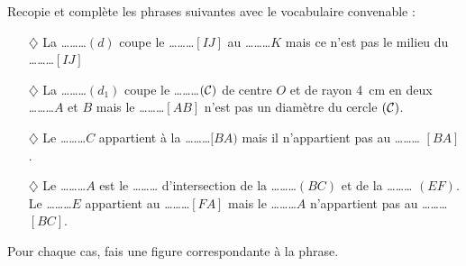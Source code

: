 \begin{myenumerate}
\item Recopie et complète les phrases suivantes avec le vocabulaire
convenable :
\begin{itemize}
\item[$\diamondsuit$] La \dots\dots\dots $(d)$ coupe le
\dots\dots\dots $[IJ]$ au \dots\dots\dots $K$ mais ce n'est pas le
milieu du \dots\dots\dots $[IJ]$
\item[$\diamondsuit$] La \dots\dots\dots $(d_1)$ coupe le
\dots\dots\dots $({\cal C})$ de centre $O$ et de rayon 4~cm en deux
\dots\dots\dots $A$ et $B$ mais le \dots\dots\dots $[AB]$ n'est pas un
diamètre du cercle $({\cal C})$.
\item[$\diamondsuit$] Le \dots\dots\dots $C$ appartient à la
\dots\dots\dots $[BA)$ mais il n'appartient pas au \dots\dots\dots
$[BA]$.
\item[$\diamondsuit$] Le \dots\dots\dots $A$ est le \dots\dots\dots
d'intersection de la \dots\dots\dots $(BC)$ et de la \dots\dots\dots
$(EF)$. Le \dots\dots\dots $E$ appartient au \dots\dots\dots $[FA]$
mais le \dots\dots\dots $A$ n'appartient pas au \dots\dots\dots
$[BC]$.
\end{itemize}
\item Pour chaque cas, fais une figure correspondante à la phrase.
\end{myenumerate}